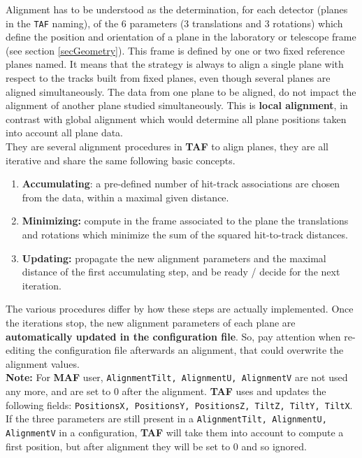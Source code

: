 \documentclass[a4paper, 12pt, twoside]{article}
\newcommand{\TAF}{{\bf TAF }}
\newcommand{\MAF}{{\bf MAF }}
\begin{document}
\noindent
Alignment has to be understood as the determination, for each detector (planes in the {\tt TAF} naming), of the 6 parameters (3 translations and 3 rotations) which define the position and orientation of a plane in the laboratory or telescope frame (see section \ref{secGeometry}). This frame is defined by one or two fixed reference planes named. It means that the strategy is always to align a single plane with respect to the tracks built from fixed planes, even though several planes are aligned simultaneously. The data from one plane to be aligned, do not impact the alignment of another plane studied simultaneously. This is {\bf local alignment}, in contrast with global alignment which would determine all plane positions taken into account all plane data.\\

\noindent
They are several alignment procedures in \TAF to align planes, they are all iterative and share the same following basic concepts.
\begin{enumerate}
\item {\bf Accumulating}: a pre-defined number of hit-track associations are chosen from the data, within a maximal given distance.
\item {\bf Minimizing:} compute in the frame associated to the plane the translations and rotations which minimize the sum of the squared hit-to-track distances.
\item {\bf Updating:} propagate the new alignment parameters and the maximal distance of the first accumulating step, and be ready / decide for the next iteration.
\end{enumerate}
The various procedures differ by how these steps are actually implemented. Once the iterations stop, the new alignment parameters of each plane are {\bf automatically updated in the configuration file}. So, pay attention when re-editing the configuration file afterwards an alignment, that could overwrite the alignment values.\\

\noindent
{\bf Note:} For \MAF user,  {\tt AlignmentTilt, AlignmentU, AlignmentV} are not used any more, and are set to $0$ after the alignment. \TAF uses and updates the following fields: {\tt PositionsX, PositionsY, PositionsZ, TiltZ, TiltY, TiltX}. If the three parameters are still present in a {\tt AlignmentTilt, AlignmentU, AlignmentV} in a configuration, \TAF will take them into account to compute a first position, but after alignment they will be set to $0$ and so ignored.\\
\end{document}

